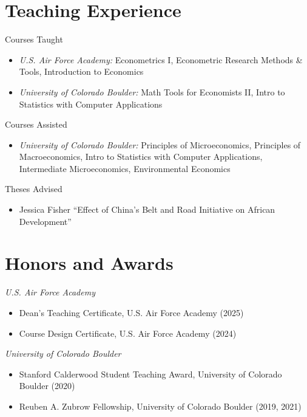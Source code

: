 \documentclass[letterpaper]{article}
\begin{document}
\section*{Teaching Experience}
  Courses Taught 
  \begin{itemize}[topsep=2pt,itemsep=-1pt,leftmargin=1em]
    \item[] \textit{U.S. Air Force Academy:} Econometrics I, Econometric Research Methods \& Tools, Introduction to Economics
    \item[] \textit{University of Colorado Boulder:} Math Tools for Economists II, Intro to Statistics with Computer Applications
  \end{itemize}
  \vspace*{.5em}
	Courses Assisted
	\begin{itemize}[topsep=2pt,itemsep=-1pt,leftmargin=1em]
    \item[] \textit{University of Colorado Boulder:} Principles of Microeconomics, Principles of Macroeconomics, Intro to Statistics with Computer Applications, Intermediate Microeconomics, Environmental Economics
  \end{itemize}
  Theses Advised
  \begin{itemize}[topsep=2pt,itemsep=-1pt,leftmargin=1em]
    \item[] Jessica Fisher ``Effect of China's Belt and Road Initiative on African Development'' 
  \end{itemize}

\section*{Honors and Awards}
  \textit{U.S. Air Force Academy}
  \begin{itemize}[topsep=2pt,itemsep=-1pt,leftmargin=1em]
    \item[] Dean's Teaching Certificate, U.S. Air Force Academy (2025)
    \item[] Course Design Certificate, U.S. Air Force Academy (2024)
  \end{itemize}
  \vspace*{.5em}
\textit{University of Colorado Boulder}
  \begin{itemize}[topsep=2pt,itemsep=-1pt,leftmargin=1em]
    \item[] Stanford Calderwood Student Teaching Award, University of Colorado Boulder (2020)
    \item[] Reuben A. Zubrow Fellowship, University of Colorado Boulder (2019, 2021)
  \end{itemize}
\end{document}
